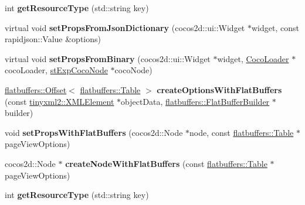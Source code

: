 \begin{DoxyCompactItemize}
int {\bfseries get\+Resource\+Type} (std\+::string key)
\item 
\mbox{\label{classcocostudio_1_1PageViewReader_aa8d935faff61d2f0d5e1d05c661e90c1}} 
virtual void {\bfseries set\+Props\+From\+Json\+Dictionary} (cocos2d\+::ui\+::\+Widget $\ast$widget, const rapidjson\+::\+Value \&options)
\item 
\mbox{\label{classcocostudio_1_1PageViewReader_a78b5a333363e4d1a7ae60999ff11136e}} 
virtual void {\bfseries set\+Props\+From\+Binary} (cocos2d\+::ui\+::\+Widget $\ast$widget, \hyperlink{classcocostudio_1_1CocoLoader}{Coco\+Loader} $\ast$coco\+Loader, \hyperlink{structcocostudio_1_1stExpCocoNode}{st\+Exp\+Coco\+Node} $\ast$coco\+Node)
\item 
\mbox{\label{classcocostudio_1_1PageViewReader_ae6e081d38182bdb88f6cc6b6b9aa9a50}} 
\hyperlink{structflatbuffers_1_1Offset}{flatbuffers\+::\+Offset}$<$ \hyperlink{classflatbuffers_1_1Table}{flatbuffers\+::\+Table} $>$ {\bfseries create\+Options\+With\+Flat\+Buffers} (const \hyperlink{classtinyxml2_1_1XMLElement}{tinyxml2\+::\+X\+M\+L\+Element} $\ast$object\+Data, \hyperlink{classflatbuffers_1_1FlatBufferBuilder}{flatbuffers\+::\+Flat\+Buffer\+Builder} $\ast$builder)
\item 
\mbox{\label{classcocostudio_1_1PageViewReader_a6ec7308dcabf9d6e93b6fe2c6b9e7224}} 
void {\bfseries set\+Props\+With\+Flat\+Buffers} (cocos2d\+::\+Node $\ast$node, const \hyperlink{classflatbuffers_1_1Table}{flatbuffers\+::\+Table} $\ast$page\+View\+Options)
\item 
\mbox{\label{classcocostudio_1_1PageViewReader_a7f03f8b599fb42144ef55fd4e8c7f8e6}} 
cocos2d\+::\+Node $\ast$ {\bfseries create\+Node\+With\+Flat\+Buffers} (const \hyperlink{classflatbuffers_1_1Table}{flatbuffers\+::\+Table} $\ast$page\+View\+Options)
\item 
\mbox{\label{classcocostudio_1_1PageViewReader_a406bf75de221db3f513a7daccbc4f047}} 
int {\bfseries get\+Resource\+Type} (std\+::string key)
\end{DoxyCompactItemize}
